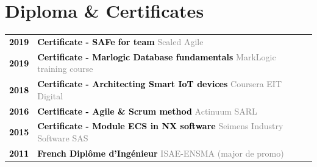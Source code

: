 \documentclass[10pt,A4]{article}
\begin{document}
\begin{minipage}[c]{0.7\textwidth}
\section*{\hspace{0.5cm}Diploma \& Certificates}
%
\begin{tabular}{P{2cm}p{11cm}}
\textcolor{black}{\bf 2019} & \textcolor{black}{ \bf Certificate - SAFe for team}  \newline \small \textcolor{gray}{Scaled Agile} \\
\textcolor{black}{\bf 2019} & \textcolor{black}{ \bf Certificate - Marlogic Database fundamentals} \newline \small \textcolor{gray}{MarkLogic training course} \\
\textcolor{black}{\bf 2018} & \textcolor{black}{ \bf Certificate - Architecting Smart IoT devices} \newline \small \textcolor{gray}{Coursera EIT Digital} \\
\textcolor{black}{\bf 2016} & \textcolor{black}{ \bf Certificate - Agile \& Scrum method} \newline \small \textcolor{gray}{Actinuum SARL} \\
\textcolor{black}{\bf 2015} & \textcolor{black}{ \bf Certificate - Module ECS in NX software} \newline \small \textcolor{gray}{Seimens Industry Software SAS} \\
\textcolor{black}{\bf 2011} & \textcolor{black}{ \bf French Diplôme d'Ingénieur} \newline \small \textcolor{gray}{ISAE-ENSMA (major de promo)} \\
\end{tabular}
%
\end{minipage}
\begin{minipage}[t]{0.01\textwidth}
\hspace{1mm}
\end{minipage}
\end{document}
